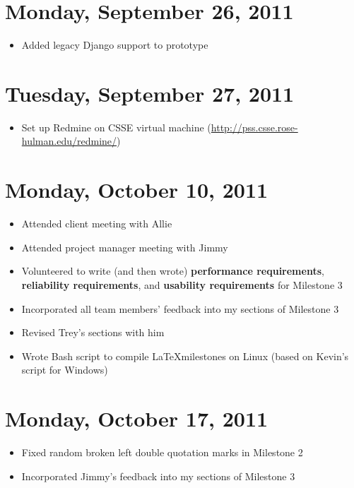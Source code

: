 \documentclass{article}
\begin{document}
\section{Monday, September 26, 2011}
\begin{itemize}
\item Added legacy Django support to prototype
\end{itemize}

\section{Tuesday, September 27, 2011}
\begin{itemize}
\item Set up Redmine on CSSE virtual machine (\url{http://pss.csse.rose-hulman.edu/redmine/})
\end{itemize}

\section{Monday, October 10, 2011}
\begin{itemize}
\item Attended client meeting with Allie
\item Attended project manager meeting with Jimmy
\item Volunteered to write (and then wrote) \textbf{performance requirements}, \textbf{reliability requirements}, and \textbf{usability requirements} for Milestone 3
\item Incorporated all team members' feedback into my sections of Milestone 3
\item Revised Trey's sections with him
\item Wrote Bash script to compile \LaTeX \space milestones on Linux (based on Kevin's script for Windows)
\end{itemize}

\section{Monday, October 17, 2011}
\begin{itemize}
\item Fixed random broken left double quotation marks in Milestone 2
\item Incorporated Jimmy's feedback into my sections of Milestone 3
\end{itemize}
\end{document}
